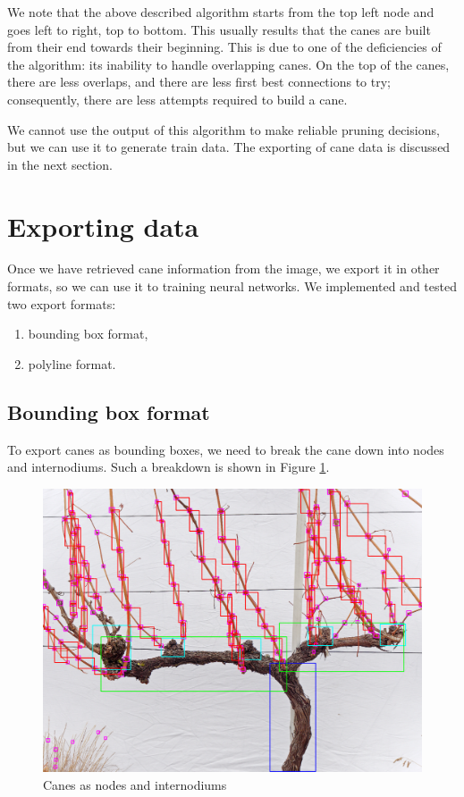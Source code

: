 \documentclass{PSAIE}%
\begin{document}
We note that the above described algorithm starts from the top left node and goes left to right, top to bottom.
This usually results that the canes are built from their end towards their beginning. This is due to one of the
deficiencies of the algorithm: its inability to handle overlapping canes. On the top of the canes, there are
less overlaps, and there are less first best connections to try; consequently, there are less attempts required to
build a cane.

We cannot use the output of this algorithm to make reliable pruning decisions, but we can use it to generate
train data. The exporting of cane data is discussed in the next section.

\section{Exporting data} \label{sec_exporting_data}
Once we have retrieved cane information from the image, we export it in other formats, so we can use it to
training neural networks. We implemented and tested two export formats:

\begin{enumerate}
      \item bounding box format,
      \item polyline format.
\end{enumerate}

\subsection{Bounding box format} \label{sec_export_bounding_box_format}
To export canes as bounding boxes, we need to break the cane down into nodes and internodiums. Such a
breakdown is shown in Figure \ref{fig_internodium_boxes}.

\begin{figure}[h]
      \centering
      \includegraphics[scale=0.28]{images/internodium_boxes.png}
      \caption{Canes as nodes and internodiums}
      \label{fig_internodium_boxes}
\end{figure}
\end{document}
